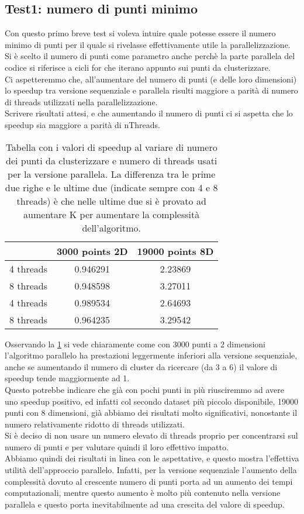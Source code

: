 \documentclass[10pt,twocolumn,letterpaper]{article}
\begin{document}
\subsection{Test1: numero di punti minimo}
\label{sec:t1}
Con questo primo breve test si voleva intuire quale potesse essere il numero minimo di punti per il quale si rivelasse effettivamente utile la parallelizzazione. Si è scelto il numero di punti come parametro anche perchè la parte parallela del codice si riferisce a cicli for che iterano appunto sui punti da clusterizzare.\\
Ci aspetteremmo che, all'aumentare del numero di punti (e delle loro dimensioni) lo speedup tra versione sequenziale e parallela risulti maggiore a parità di numero di threads utilizzati nella parallelizzazione.\\
Scrivere risultati attesi, e che aumentando il numero di punti ci si aspetta che lo speedup sia maggiore a parità di nThreads.
\begin{table}[h]
\centering
\begin{tabular}{ |c|c|c| } 
\hline
 & 3000 points 2D & 19000 points 8D \\
\hline
4 threads & 0.946291 & 2.23869\\
\hline
8 threads & 0.948598 & 3.27011\\
\hline
4 threads & 0.989534 & 2.64693\\
\hline
8 threads & 0.964235 & 3.29542\\
\hline
\end{tabular}
\vspace*{3mm}
\caption{Tabella con i valori di speedup al variare di numero dei punti da clusterizzare e numero di threads usati per la versione parallela. La differenza tra le prime due righe e le ultime due (indicate sempre con 4 e 8 threads) è che nelle ultime due si è provato ad aumentare K per aumentare la complessità dell'algoritmo.}
\label{table:t1}
\end{table}
Osservando la \cref{table:t1} si vede chiaramente come con 3000 punti a 2 dimensioni l'algoritmo parallelo ha prestazioni leggermente inferiori alla versione sequenziale, anche se aumentando il numero di cluster da ricercare (da 3 a 6) il valore di speedup tende maggiormente ad 1.\\
Questo potrebbe indicare che già con pochi punti in più riusciremmo ad avere uno speedup positivo, ed infatti col secondo dataset più piccolo disponibile, 19000 punti con 8 dimensioni, già abbiamo dei risultati molto significativi, nonostante il numero relativamente ridotto di threads utilizzati.\\
Si è deciso di non usare un numero elevato di threads proprio per concentrarsi sul numero di punti e per valutare quindi il loro effettivo impatto.\\
Abbiamo quindi dei risultati in linea con le aspettative, e questo mostra l'effettiva utilità dell'approccio parallelo. Infatti, per la versione sequenziale l'aumento della complessità dovuto al crescente numero di punti porta ad un aumento dei tempi computazionali, mentre questo aumento è molto più contenuto nella versione parallela e questo porta inevitabilmente ad una crescita del valore di speedup.
\end{document}

